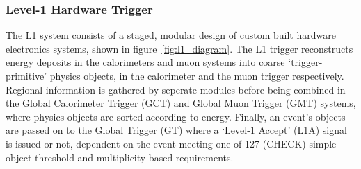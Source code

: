 \subsubsection{Level-1 Hardware Trigger}

The L1 system consists of a staged, modular design of custom built hardware 
electronics systems, shown in figure~\ref{fig:l1_diagram}. 
The L1 trigger reconstructs energy deposits in the calorimeters and muon systems
into coarse `trigger-primitive' physics objects, in the calorimeter and the muon 
trigger respectively. Regional information is gathered by seperate modules 
before being combined in the Global Calorimeter Trigger (GCT) and Global Muon 
Trigger (GMT) systems, where physics objects are sorted according to energy. 
Finally, an event's objects are passed on to the Global Trigger (GT) where a 
`Level-1 Accept' (L1A) signal is issued or not, dependent on the event meeting 
one of 127 (CHECK) simple object threshold and multiplicity based requirements.


